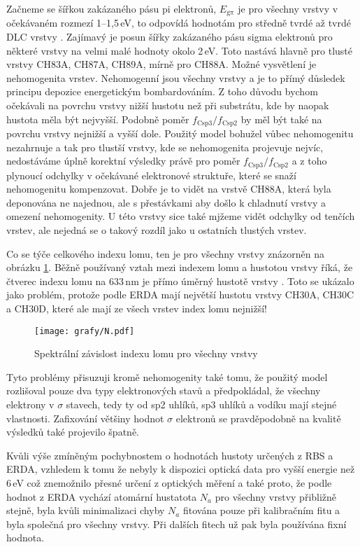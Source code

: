 Začneme se šířkou zakázaného pásu pi elektronů, $E_\mathrm{g\pi}$ je pro všechny vrstvy v očekávaném rozmezí 1--1,5\,eV, to odpovídá hodnotám pro středně tvrdé až tvrdé DLC vrstvy \cite{Robertson2002}. 
Zajímavý je posun šířky zakázaného pásu sigma elektronů pro některé vrstvy na velmi malé hodnoty okolo 2\,eV. Toto nastává hlavně pro tlusté vrstvy CH83A, CH87A, CH89A, mírně pro CH88A. Možné vysvětlení je nehomogenita vrstev. Nehomogenní jsou všechny vrstvy a je to přímý důsledek principu depozice energetickým bombardováním. 
Z toho důvodu bychom očekávali na povrchu vrstvy nižší hustotu než při substrátu, kde by naopak hustota měla být nejvyšší. Podobně poměr $f_\mathrm{Csp3}/f_\mathrm{Csp2}$ by měl být také na povrchu vrstvy nejnižší a vyšší dole. Použitý model bohužel vůbec nehomogenitu nezahrnuje a tak pro tlustší vrstvy, kde se nehomogenita projevuje nejvíc, nedostáváme úplně korektní výsledky právě pro poměr $f_\mathrm{Csp3}/f_\mathrm{Csp2}$ a z toho plynoucí odchylky v očekávané elektronové struktuře, které se snaží nehomogenitu kompenzovat. Dobře je to vidět na vrstvě CH88A, která byla deponována ne najednou, ale s přestávkami aby došlo k chladnutí vrstvy a omezení nehomogenity. U této vrstvy sice také mjžeme vidět odchylky od tenčích vrstev, ale nejedná se o takový rozdíl jako u ostatních tlustých vrstev. 

Co se týče celkového indexu lomu, ten je pro všechny vrstvy znázorněn  na obrázku \ref{index}. Běžně používaný vztah mezi indexem lomu a hustotou vrstvy říká, že čtverec indexu lomu na 633\,nm je přímo úměrný hustotě vrstvy \cite{Donnet2008}. Toto se ukázalo jako problém, protože podle ERDA mají největší hustotu vrstvy CH30A, CH30C a CH30D, které ale mají ze všech vrstev index lomu nejnižší!

\begin{figure}[tbhp]
	\texttt{[image: grafy/N.pdf]}
	\caption{Spektrální závislost indexu lomu pro všechny vrstvy} 
	\label{index}
\end{figure}

Tyto problémy přisuzuji kromě nehomogenity také tomu, že použitý model rozlišoval pouze dva typy elektronových stavů a předpokládal, že všechny elektrony v $\sigma$ stavech, tedy ty od sp2 uhlíků, sp3 uhlíků a vodíku mají stejné vlastnosti. Zafixování většiny hodnot $\sigma$ elektronů se pravděpodobně na kvalitě výsledků také projevilo špatně.

Kvůli výše zmíněným pochybnostem o hodnotách hustoty určených z RBS a ERDA, vzhledem k tomu že nebyly k dispozici optická data pro vyšší energie než 6\,eV což znemožnilo přesné určení z optických měření  a také proto, že podle hodnot z ERDA vychází atomární hustatota $N_a$ pro všechny vrstvy přibližně stejně, byla kvůli minimalizaci chyby $N_a$ fitována pouze při kalibračním fitu a byla společná pro všechny vrstvy. Při dalších fitech už pak byla používána fixní hodnota.  


